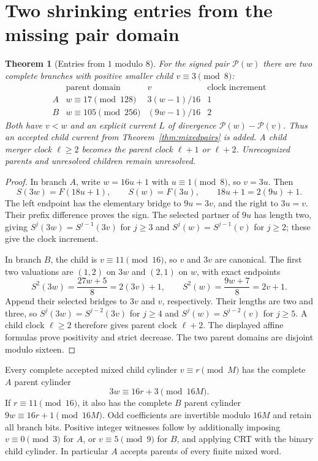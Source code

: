 \documentclass[11pt]{article}
\newtheorem{theorem}{Theorem}
\begin{document}
\section{Two shrinking entries from the missing pair domain}
\begin{theorem}[Entries from $1$ modulo $8$]\label{thm:pairone}
For the signed pair $\mathcal P(w)$ there are two complete branches
with positive smaller child $v\equiv3\pmod8$:
\[
\begin{array}{c|c|c|c}
&\text{parent domain}&v&\text{clock increment}\\\hline
A&w\equiv17\pmod{128}&3(w-1)/16&1\\
B&w\equiv105\pmod{256}&(9w-1)/16&2
\end{array}
\]
Both have $v<w$ and an explicit current $L$ of divergence
$\mathcal P(w)-\mathcal P(v)$. Thus an accepted child current from
Theorem~\ref{thm:mixedpairs} is added. A child merger clock
$\ell\ge2$ becomes the parent clock $\ell+1$ or $\ell+2$.
Unrecognized parents and unresolved children remain unresolved.
\end{theorem}
\begin{proof}
In branch $A$, write $w=16u+1$ with $u\equiv1\pmod8$, so $v=3u$.
Then
\[
S(3w)=F(18u+1),\qquad S(w)=F(3u),\qquad
18u+1=2(9u)+1.
\]
The left endpoint has the elementary bridge to $9u=3v$, and the
right to $3u=v$. Their prefix difference proves the sign. The
selected partner of $9u$ has length two, giving
$S^j(3w)=S^{j-1}(3v)$ for $j\ge3$ and
$S^j(w)=S^{j-1}(v)$ for $j\ge2$; these give the clock increment.

In branch $B$, the child is $v\equiv11\pmod{16}$, so $v$ and
$3v$ are canonical. The first two valuations are $(1,2)$ on $3w$
and $(2,1)$ on $w$, with exact endpoints
\[
S^2(3w)=\frac{27w+5}{8}=2(3v)+1,\qquad
S^2(w)=\frac{9w+7}{8}=2v+1.
\]
Append their selected bridges to $3v$ and $v$, respectively.
Their lengths are two and three, so
$S^j(3w)=S^{j-2}(3v)$ for $j\ge4$ and
$S^j(w)=S^{j-2}(v)$ for $j\ge5$. A child clock $\ell\ge2$
therefore gives parent clock $\ell+2$. The displayed affine formulas
prove positivity and strict decrease. The two parent domains are
disjoint modulo sixteen.
\end{proof}

Every complete accepted mixed child cylinder $v\equiv r\pmod M$
has the complete $A$ parent cylinder
\[
3w\equiv16r+3\pmod{16M}.
\]
If $r\equiv11\pmod{16}$, it also has the complete $B$ parent
cylinder $9w\equiv16r+1\pmod{16M}$. Odd coefficients are invertible
modulo $16M$ and retain all branch bits. Positive integer witnesses
follow by additionally imposing $v\equiv0\pmod3$ for $A$, or
$v\equiv5\pmod9$ for $B$, and applying CRT with the binary child
cylinder. In particular $A$ accepts parents of every finite mixed word.
\end{document}

